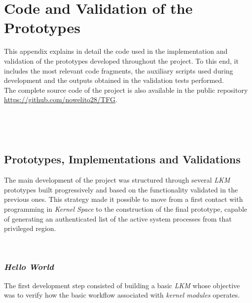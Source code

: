 \chapter{Code and Validation of the Prototypes}
\label{anexo:codigo-prototipos}

This appendix explains in detail the code used in the implementation and validation of the prototypes developed throughout the project.
To this end, it includes the most relevant code fragments, the auxiliary scripts used during development and the outputs obtained in the validation tests performed.\\

The complete source code of the project is also available in the public repository \url{https://github.com/nowelito28/TFG}.

\

\

\section{Prototypes, Implementations and Validations}

The main development of the project was structured through several \textit{LKM} prototypes built progressively and based on the functionality validated in the previous ones.
This strategy made it possible to move from a first contact with programming in \textit{Kernel Space} to the construction of the final prototype, capable of generating an authenticated list of the active system processes from that privileged region.

\

\subsection{\textit{Hello World}}
\label{sec:proto-helloworld}

The first development step consisted of building a basic \textit{LKM} whose objective was to verify how the basic workflow associated with \textit{kernel modules} operates.\\

